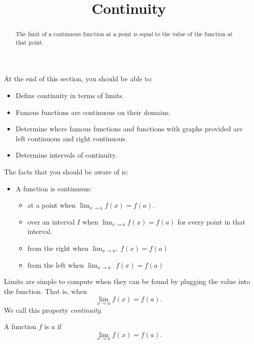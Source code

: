 \documentclass{ximera}
\title{Continuity}
\begin{document}
\begin{abstract}
The limit of a continuous function at a point is equal to the value of the function at that point. 
\end{abstract}
\maketitle
At the end of this section, you should be able to:
\begin{itemize}
\item Define continuity in terms of limits.
\item Famous functions are continuous on their domains.
\item Determine where famous functions and functions with graphs provided are left continuous and right continuous.
\item Determine intervals of continuity.
\end{itemize}

The facts that you should be aware of is:
\begin{itemize}
    \item A function is continuous: 
    \begin{itemize}
        \item  at a point when 
    $\lim_{x\to a} f(x)=f(a)$.
    \item over an interval $I$ when  $\lim_{x\to a} f(x)=f(a)$ for every point in that interval.
    \item from the right when  $\lim_{x\to a^+} f(x)=f(a)$
    \item from the left when $\lim_{x\to a^-} f(x)=f(a)$
    \end{itemize}
 
\end{itemize}

Limits are simple to compute when they can be found by plugging the
value into the function.  That is, when
\[
\lim_{x\to a}f(x) = f(a).
\]
We call this property \textit{continuity}.

\begin{definition}
  A function $f$ is  $a$ if
  \[
  \lim_{x\to a}f(x) = f(a).
  \]
\end{definition}
\end{document}
